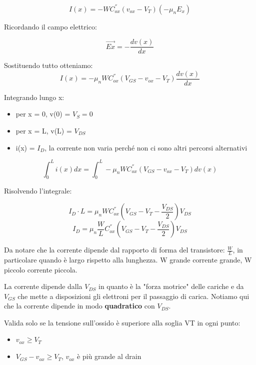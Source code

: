 \begin{equation}
    I(x) = -WC_{ox}^{''}(v_{ox}-V_T)(-\mu_nE_x)
\end{equation}

Ricordando il campo elettrico:

\begin{equation*}
    \vec{Ex} = -\frac{dv(x)}{dx}
\end{equation*}

Sostituendo tutto otteniamo:
\begin{equation}
    I(x) = -\mu_nWC_{ox}^{''}(V_{GS}-v_{ox}-V_T)\frac{dv(x)}{dx}
\end{equation}

Integrando lungo x:

\begin{itemize}
    \item per x = 0, v(0) = $V_S = 0$
    \item per x = L, v(L) = $V_{DS}$
    \item i(x) = $I_D$, la corrente non varia perché non ci sono altri percorsi alternativi
\end{itemize}

\begin{equation}
    \int_0^Li(x) dx = \int_0^L-\mu_nWC_{ox}^{''}(V_{GS}-v_{ox}-V_T)dv(x)
\end{equation}

Risolvendo l'integrale:

\begin{equation*}
    I_D\cdot L = \mu_nWC_{ox}^{''}(V_{GS}-V_T-\frac{V_{DS}}{2})V_{DS}
\end{equation*}
\begin{equation}
    I_D = \mu_n\frac{W}{L}C_{ox}^{''}(V_{GS}-V_T-\frac{V_{DS}}{2})V_{DS}
    \label{equazione_zona_triodo}
\end{equation}

Da notare che la corrente dipende dal rapporto di forma del transistore: $\frac{W}{L}$, in particolare quando è largo rispetto alla lunghezza. W grande corrente grande, W piccolo corrente piccola.

La corrente dipende dalla $V_{DS}$ in quanto è la "forza motrice" delle cariche e da $V_{GS}$ che mette a disposizioni gli elettroni per il passaggio di carica. Notiamo qui che la corrente dipende in modo \textbf{quadratico} con $V_{DS}$.

Valida	solo	se	la	tensione sull'ossido	è	superiore	alla soglia	VT in	ogni	punto:

\begin{itemize}
    \item $v_{ox} \geq V_T$
    \item $V_{GS} - v_{ox} \geq V_T$, $v_{ox}$ è	più	grande	al	drain
\end{itemize}

